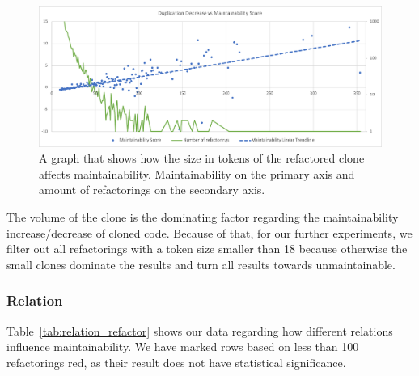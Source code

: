 \begin{figure}[H]
  \includegraphics[width=1\textwidth]{img/duplication}
  \caption{A graph that shows how the size in tokens of the refactored clone affects maintainability. Maintainability on the primary axis and amount of refactorings on the secondary axis.}
  \label{fig:duplication}
\end{figure}

The volume of the clone is the dominating factor regarding the maintainability increase/decrease of cloned code. Because of that, for our further experiments, we filter out all refactorings with a token size smaller than 18 because otherwise the small clones dominate the results and turn all results towards unmaintainable.

\subsubsection{Relation}
Table~\ref{tab:relation_refactor} shows our data regarding how different relations influence maintainability. We have marked rows based on less than 100 refactorings red, as their result does not have statistical significance.

